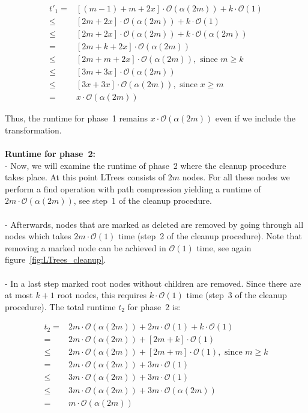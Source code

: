 \documentclass[a4paper,12pt, titlepage]{article}  %
\newcommand{\oh}{\mathcal{O}}   %
\begin{document}
\begin{align*}   %
     t'_1  = &  [ (m-1) + m + 2x ]  \cdot \oh(\alpha(2m)) + k \cdot \oh(1)    \\
         \leq &  [ 2m + 2x ]    \cdot \oh(\alpha(2m)) + k \cdot \oh(1)  \\
         \leq &   [2m + 2x] \cdot \oh(\alpha(2m)) + k \cdot \oh(\alpha(2m)) \\
         = &   [2m + k + 2x] \cdot \oh(\alpha(2m)) \\
         \leq &   [2m  + m + 2x] \cdot \oh(\alpha(2m)), \text{  since  } m \geq k   \\
         \leq &   [3m + 3x ]  \cdot \oh(\alpha(2m)) \\
         \leq &   [3x   + 3x]  \cdot \oh(\alpha(2m)), \text{  since  } x \geq m \\
           =  &             x      \cdot \oh(\alpha(2m))  
\end{align*}

Thus, the runtime for phase~1 remains $x \cdot \oh(\alpha(2m))$ even if we include the transformation. \\
\\
\noindent \textbf{Runtime for phase~2:} \\
\noindent - Now, we will examine the runtime of phase~2 where the cleanup procedure takes place. At this point LTrees consists of
$2m$ nodes. For all these nodes we perform a find operation with path compression yielding a runtime of $2m \cdot \oh(\alpha(2m))$, 
see step~1 of the cleanup procedure. \\
\\
- Afterwards, nodes that are marked as deleted are removed by going through all nodes which takes $2m \cdot \oh(1)$ time
(step~2 of the cleanup procedure).  
Note that removing a marked node can be achieved in $\oh(1)$ time, see again figure~\ref{fig:LTrees_cleanup}.\\
\\
- In a last step marked root nodes without children are removed. Since there are at most $k+1$ root nodes, this requires $k \cdot \oh(1)$ time (step~3 of the cleanup procedure).
The total runtime $t_2$ for phase~2 is:

\begin{align*}   %
   t_2 =   & 2m \cdot \oh(\alpha(2m)) + 2m \cdot \oh(1) + k \cdot \oh(1) \\
=    & 2m \cdot \oh(\alpha(2m)) + [2m+ k] \cdot \oh(1) \\
\leq & 2m \cdot \oh(\alpha(2m)) + [2m+ m] \cdot \oh(1), \text{  since  } m \geq k \\
=   &  2m \cdot \oh(\alpha(2m)) + 3m \cdot \oh(1)\\
\leq &  3m \cdot \oh(\alpha(2m)) + 3m \cdot \oh(1)\\
\leq &  3m \cdot \oh(\alpha(2m)) + 3m \cdot \oh(\alpha(2m))\\
=   &  m \cdot \oh(\alpha(2m))
\end{align*} %
\end{document}
